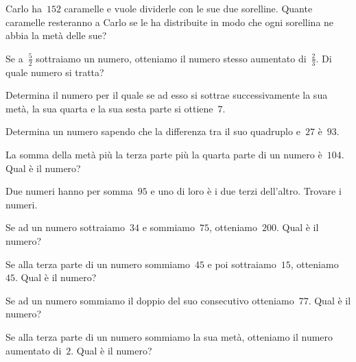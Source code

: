 \begin{multicols}{2}
\begin{esercizio}[\Ast]
\label{ese:16.10}
Carlo ha~$152$ caramelle e vuole dividerle con le sue due sorelline. Quante caramelle resteranno a Carlo se le ha distribuite in modo che ogni sorellina ne abbia la metà delle sue?
\end{esercizio}

\begin{esercizio}[\Ast]
\label{ese:16.11}
Se a~$\frac{5}{2}$ sottraiamo un numero, otteniamo il numero stesso aumentato di~$\frac{2}{3}$. Di quale numero si tratta?
\end{esercizio}

\begin{esercizio}[\Ast]
\label{ese:16.12}
Determina il numero per il quale se ad esso si sottrae successivamente la sua metà, la sua quarta e la sua sesta parte si  ottiene~$7$.
\end{esercizio}

\begin{esercizio}[\Ast]
\label{ese:16.13}
Determina un numero sapendo che la differenza tra il suo quadruplo e~$27$ è~$93$.
\end{esercizio}

\begin{esercizio}[\Ast]
\label{ese:16.14}
La somma della metà più la terza parte più la quarta parte di un numero è~$104$. Qual è il numero?
\end{esercizio}

\begin{esercizio}[\Ast]
\label{ese:16.15}
Due numeri hanno per somma~$95$ e uno di loro è i due terzi dell'altro. Trovare i numeri.
\end{esercizio}

\begin{esercizio}[\Ast]
\label{ese:16.16}
Se ad un numero sottraiamo~$34$ e sommiamo~$75$, otteniamo~$200$. Qual è il numero?
\end{esercizio}

\begin{esercizio}[\Ast]
\label{ese:16.17}
Se alla terza parte di un numero sommiamo~$45$ e poi sottraiamo~$15$, otteniamo~$45$. Qual è il numero?
\end{esercizio}

\begin{esercizio}[\Ast]
\label{ese:16.18}
Se ad un numero sommiamo il doppio del suo consecutivo otteniamo~$77$. Qual è il numero?
\end{esercizio}

\begin{esercizio}[\Ast]
\label{ese:16.19}
Se alla terza parte di un numero sommiamo la sua metà, otteniamo il numero aumentato di~$2$. Qual è il numero?
\end{esercizio}


\end{multicols}
